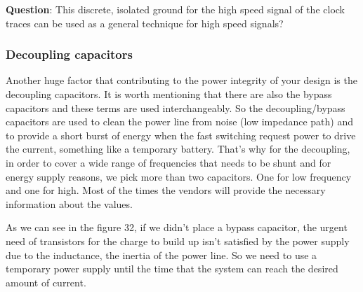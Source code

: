 \documentclass[final]{cubedoc}
\begin{document}
	\textbf{Question}: This discrete, isolated ground for the high speed signal of the clock traces can be used as a general technique for high speed signals?
	
	\subsubsection{Decoupling capacitors}
	
	Another huge factor that contributing to the power integrity of your design is the decoupling capacitors. It is worth mentioning that there are also the bypass capacitors and these terms are used interchangeably. So the decoupling/bypass capacitors are used to clean the power line from noise (low impedance path) and to provide a short burst of energy when the fast switching request power to drive the current, something like a temporary battery. That's why for the decoupling, in order to cover a wide range of frequencies that needs to be shunt and for energy supply reasons, we pick more than two capacitors. One for low frequency and one for high. Most of the times the vendors will provide the necessary information about the values.
	
	As we can see in the figure 32, if we didn't place a bypass capacitor, the urgent need of transistors for the charge to build up isn't satisfied by the power supply due to the inductance, the inertia of the power line. So we need to use a temporary power supply until the time that the system can reach the desired amount of current. 
	
\end{document}
